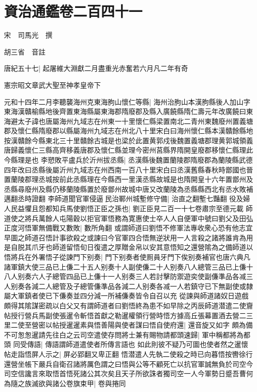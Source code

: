 \chapter{資治通鑑卷二百四十一}
宋　司馬光　撰

胡三省　音註

唐紀五十七|{
	起屠維大淵獻二月盡重光赤奮若六月凡二年有奇}


憲宗昭文章武大聖至神孝皇帝下

元和十四年二月李聽襲海州克東海朐山懷仁等縣|{
	海州治朐山本漢胊縣後人加山字東海漢贛榆縣地後齊置東海縣屬東海郡隋廢郡及縣入廣饒縣隋仁壽元年改廣饒曰東海避太子諱也唐屬海州九域志在州東一十里懷仁縣梁置南北二青州東魏廢州置義塘郡及懷仁縣隋廢郡以縣屬海州九域志在州北八十里宋白曰海州懷仁縣本漢贛餘縣地按漢贛餘今縣東北三十里贛餘古城是也梁於此置黄郭戍後魏置義塘郡理黄郭城領義唐歸義懷仁三縣高齊移義唐郡及懷仁縣並理今密州莒縣界隋開皇廢郡移懷仁縣理此今縣理是也}
李愬敗平盧兵於沂州拔丞縣|{
	丞漢縣後魏置蘭陵郡隋廢郡為蘭陵縣武德四年改曰丞縣後屬沂州九域志在州西南一百八十里宋白曰丞漢舊縣春秋時鄫國也晉置蘭陵郡理丞城按前此丞縣理在今縣西一里漢丞縣故城是也隋開皇十六年置鄫州及丞縣尋廢州及縣仍移蘭陵縣置於廢鄫州故城中唐又改蘭陵為丞縣縣西北有丞水敗補邁翻丞時證翻}
李師道聞官軍侵逼民治鄆州城塹修守備|{
	治直之翻塹七豔翻}
役及婦人民益懼且怨都知兵馬使劉悟正臣之孫也|{
	劉正臣見二百一十七卷肅宗至德元載}
師道使之將兵萬餘人屯陽穀以拒官軍悟務為寛惠使士卒人人自便軍中號曰劉父及田弘正度河悟軍無備戰又數敗|{
	數所角翻}
或謂師道曰劉悟不修軍法專收衆心恐有他志宜早圖之師道召悟計事欲殺之或諫曰今官軍四合悟無逆狀用一人言殺之諸將誰肯為用是自脱其爪牙也師道留悟旬日復遣之厚贈金帛以安其意悟知之還營隂為之備師道以悟將兵在外署悟子從諫門下别奏|{
	門下别奏者使厠員牙門下俟别奏補官也唐六典凡諸軍鎮大使三品已上傔二十五人别奏十人副使傔二十人别奏八人總管三品已上傔十八人别奏六人子總管四品已上傔十一人别奏三人若討擊防禦遊奕使副傔準品各减三人别奏各減二人總管及子總管傔準品各減二人别奏各减一人若鎮守已下無副使或隸屬大軍鎮者使已下傔奏並四分減一所補傔奏皆令自召以充}
從諫與師道諸奴日遊戲頗得其隂謀密疏以白父又有謂師道者曰劉悟終為患不如早除之丙辰師道潜遣二使齎帖授行營兵馬副使張暹令斬悟首獻之勒暹權領行營時悟方據高丘張幕置酒去營二三里二使至營密以帖授暹暹素與悟善陽與使者謀曰悟自使府還|{
	還音旋又如字}
頗為備不可怱怱暹請先往白之云司空遣使存問將士兼有賜物請都頭速歸|{
	軍中稱都將為都頭}
同受傳語|{
	傳語謂師道遣使者所傳言語也}
如此則彼不疑乃可圖也使者然之暹懷帖走詣悟屏人示之|{
	屏必郢翻又卑正翻}
悟潜遣人先執二使殺之時已向暮悟按轡徐行還營坐帳下嚴兵自衛召諸將厲色謂之曰悟與公等不顧死亡以抗官軍誠無負於司空今司空信讒言來取悟首悟死諸公其次矣且天子所欲誅者獨司空一人今軍勢日蹙吾曹何為隨之族滅欲與諸公卷旗束甲|{
	卷與捲同}
